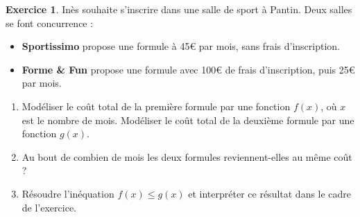 \documentclass{article}
\theoremstyle{definition}
\newtheorem{exercice}{Exercice}
\begin{document}
% 
% 
% 

\begin{exercice}
  Inès souhaite s'inscrire dans une salle de sport à Pantin. Deux salles se font concurrence :

  \begin{itemize}
    \item \textbf{Sportissimo} propose une formule à 45€ par mois, sans frais d'inscription.
    \item \textbf{Forme \& Fun} propose une formule avec 100€ de frais d'inscription, puis 25€ par mois.
  \end{itemize}

  \begin{enumerate}
    \item Modéliser le coût total de la première formule par une fonction \(f(x)\), où \(x\) est le nombre de mois.
      Modéliser le coût total de la deuxième formule par une fonction \(g(x)\).
    \item Au bout de combien de mois les deux formules reviennent-elles au même coût ?
    \item Résoudre l'inéquation \(f(x) \le g(x)\) et interpréter ce résultat dans le cadre de l'exercice.
  \end{enumerate}
  \begin{center}
  \end{center}
\end{exercice}
\end{document}
